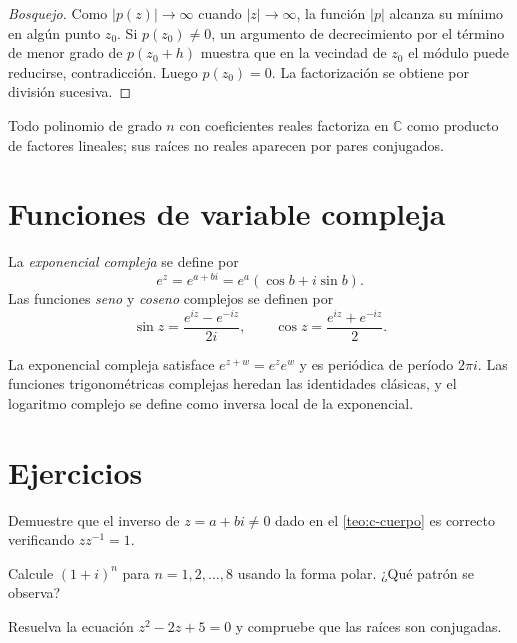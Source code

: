 \begin{proof}[Bosquejo]
Como $|p(z)|\to\infty$ cuando $|z|\to\infty$, la función $|p|$ alcanza su mínimo en algún punto $z_0$. Si $p(z_0)\neq 0$, un argumento de decrecimiento por el término de menor grado de $p(z_0+h)$ muestra que en la vecindad de $z_0$ el módulo puede reducirse, contradicción. Luego $p(z_0)=0$. La factorización se obtiene por división sucesiva.
\end{proof}

\begin{corollary}
Todo polinomio de grado $n$ con coeficientes reales factoriza en $\mathbb{C}$ como producto de factores lineales; sus raíces no reales aparecen por pares conjugados.
\end{corollary}

\section{Funciones de variable compleja}

\begin{definition}
\label{def:exp-compleja}
La \emph{exponencial compleja} se define por
\[
  e^{z}=e^{a+bi}=e^{a}(\cos b+i\sin b).
\]
Las funciones \emph{seno} y \emph{coseno} complejos se definen por
\[
  \sin z=\frac{e^{iz}-e^{-iz}}{2i},\qquad
  \cos z=\frac{e^{iz}+e^{-iz}}{2}.
\]
\end{definition}

La exponencial compleja satisface $e^{z+w}=e^{z}e^{w}$ y es periódica de período $2\pi i$. Las funciones trigonométricas complejas heredan las identidades clásicas, y el logaritmo complejo se define como inversa local de la exponencial.

\section{Ejercicios}

\begin{exercise}
Demuestre que el inverso de $z=a+bi\neq 0$ dado en el \cref{teo:c-cuerpo} es correcto verificando $z z^{-1}=1$.
\end{exercise}

\begin{exercise}
Calcule $(1+i)^n$ para $n=1,2,\dots,8$ usando la forma polar. ¿Qué patrón se observa?
\end{exercise}

\begin{exercise}
Resuelva la ecuación $z^2-2z+5=0$ y compruebe que las raíces son conjugadas.
\end{exercise}

